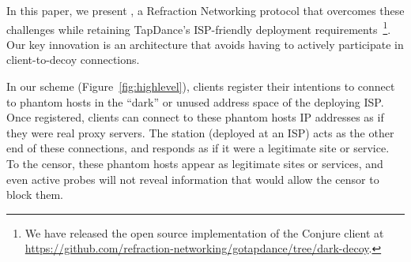 \documentclass[sigconf]{acmart}
\newcommand{\TODO}[1]{}
\renewcommand{\TODO}[1]{{\color{red} TODO: {#1}}}
\begin{document}



\smallskip

In this paper, we present \textbf{\scheme}, a Refraction
Networking protocol that overcomes these challenges while retaining
TapDance's ISP-friendly deployment requirements~\footnote{
We have released the open source implementation of the Conjure client at 
\url{https://github.com/refraction-networking/gotapdance/tree/dark-decoy}.}.
Our key innovation is an architecture that avoids
having to actively participate in client-to-decoy connections.

In our scheme (Figure~\ref{fig:highlevel}), clients
register their intentions to connect to phantom hosts in the ``dark''
or unused address space of the deploying ISP. Once registered, clients
can connect to these phantom hosts IP addresses as if they were real
proxy servers. The \scheme station (deployed at an ISP) acts as the other end of these connections, and
responds as if it were a legitimate site or service. To the censor,
these phantom hosts appear as legitimate sites or services, and even
active probes will not reveal information that would allow the censor to
block them.

\end{document}
